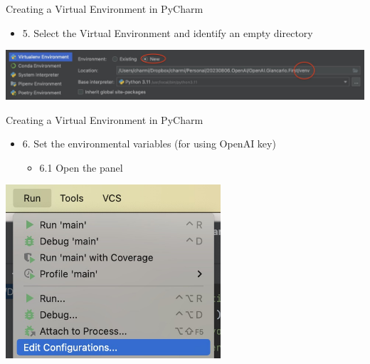 \documentclass{beamer}
\begin{document}
\begin{frame}
{\centerline{Creating a Virtual Environment in PyCharm}}
\begin{itemize}
    \item 5. Select the Virtual Environment and identify an empty directory
\end{itemize} 
\begin{center}
    \includegraphics[width=\textwidth]{Coding/PyCharm.VirtualEnvironment.jpg}
\end{center}
\end{frame}

\begin{frame}
{\centerline{Creating a Virtual Environment in PyCharm}}
\begin{itemize}
    \item 6. Set the environmental variables (for using OpenAI key) 
    \begin{itemize}
    \item 6.1 Open the panel
    \end{itemize} 
\end{itemize} 
\begin{center}
    \includegraphics[width=0.6\textwidth]{Coding/PyCharm.RunEditConfigurations.jpg}
\end{center}
\end{frame}
\end{document}

